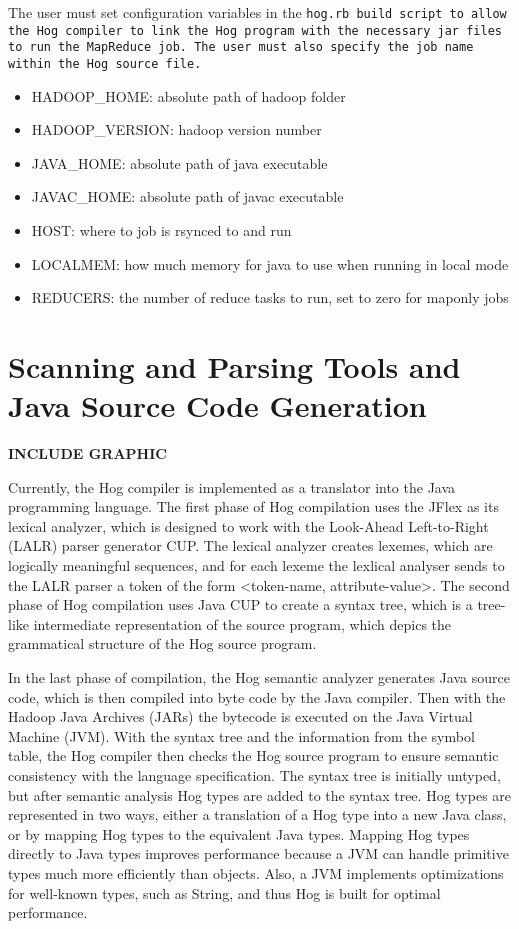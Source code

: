 \documentclass{book}
\begin{document}
The user must set configuration variables in the \tt hog.rb \rm build script to
allow the Hog compiler to link the Hog program with the necessary jar files to run
the MapReduce job. The user must also specify the job name within the Hog source
file.

\begin{itemize}

\item[] HADOOP\_HOME: absolute path of hadoop folder
\item[] HADOOP\_VERSION: hadoop version number
\item[] JAVA\_HOME: absolute path of java executable
\item[] JAVAC\_HOME: absolute path of javac executable
\item[] HOST: where to job is rsynced to and run
\item[] LOCALMEM: how much memory for java to use when running in local mode 
\item[] REDUCERS: the number of reduce tasks to run, set to zero for map­only jobs

\end{itemize}


\chapter{Scanning and Parsing Tools and Java Source Code Generation} %
\label{cha:parsing_tools}

\textbf{INCLUDE GRAPHIC}

Currently, the Hog compiler is implemented as a translator into the Java programming 
language. The first phase of Hog compilation uses the JFlex as its lexical analyzer,
which is designed to work with the Look-Ahead Left-to-Right (LALR) parser generator
CUP. The lexical analyzer creates lexemes, which are logically meaningful sequences,
and for each lexeme the lexlical analyser sends to the LALR parser a token of the
form <token-name, attribute-value>. The second phase of Hog compilation uses Java CUP
to create a syntax tree, which is a tree-like intermediate representation of the source
program, which depics the grammatical structure of the Hog source program.

In the last phase of compilation, the Hog semantic analyzer generates Java source code,
which is then compiled into byte code by the Java compiler. Then with the Hadoop Java Archives
(JARs) the bytecode is executed on the Java Virtual Machine (JVM). With the syntax tree and
the information from the symbol table, the Hog compiler then checks the Hog source program
to ensure semantic consistency with the language specification. The syntax tree is initially
untyped, but after semantic analysis Hog types are added to the syntax tree. Hog types are
represented in two ways, either a translation of a Hog type into a new Java class, or by
mapping Hog types to the equivalent Java types. Mapping Hog types directly to Java types
improves performance because a JVM can handle primitive types much more efficiently than 
objects. Also, a JVM implements optimizations for well-known types, such as String, and 
thus Hog is built for optimal performance.
\end{document}
